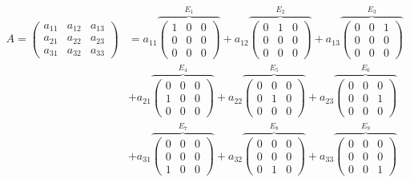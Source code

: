 \documentclass[a4paper,12pt]{article}
\begin{document}
  \begin{equation*}
  \begin{split}
    A = \begin{pmatrix}
      a_{11} & a_{12} & a_{13}\\
      a_{21} & a_{22} & a_{23}\\
      a_{31} & a_{32} & a_{33}
    \end{pmatrix}
    &= a_{11} \overbrace{\begin{pmatrix}
      1 & 0 & 0\\
      0 & 0 & 0\\
      0 & 0 & 0
    \end{pmatrix}}^{E_1}
    + a_{12} \overbrace{\begin{pmatrix}
      0 & 1 & 0\\
      0 & 0 & 0\\
      0 & 0 & 0
    \end{pmatrix}}^{E_2}
    + a_{13} \overbrace{\begin{pmatrix}
      0 & 0 & 1\\
      0 & 0 & 0\\
      0 & 0 & 0
    \end{pmatrix}}^{E_3}\\
    &+ a_{21} \overbrace{\begin{pmatrix}
      0 & 0 & 0\\
      1 & 0 & 0\\
      0 & 0 & 0
    \end{pmatrix}}^{E_4}
    + a_{22} \overbrace{\begin{pmatrix}
      0 & 0 & 0\\
      0 & 1 & 0\\
      0 & 0 & 0
    \end{pmatrix}}^{E_5}
    + a_{23} \overbrace{\begin{pmatrix}
      0 & 0 & 0\\
      0 & 0 & 1\\
      0 & 0 & 0
    \end{pmatrix}}^{E_6}\\
    &+ a_{31} \overbrace{\begin{pmatrix}
      0 & 0 & 0\\
      0 & 0 & 0\\
      1 & 0 & 0
    \end{pmatrix}}^{E_7}
    + a_{32} \overbrace{\begin{pmatrix}
      0 & 0 & 0\\
      0 & 0 & 0\\
      0 & 1 & 0
    \end{pmatrix}}^{E_8}
    + a_{33} \overbrace{\begin{pmatrix}
      0 & 0 & 0\\
      0 & 0 & 0\\
      0 & 0 & 1
    \end{pmatrix}}^{E_9}
  \end{split}
  \end{equation*}
  
\end{document}
